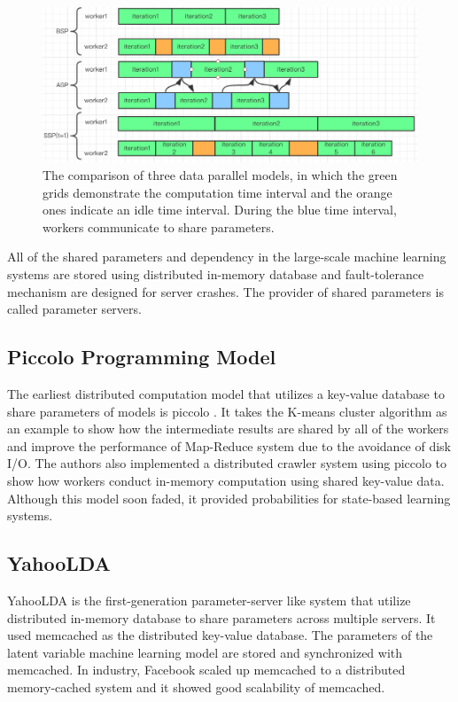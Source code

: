 \documentclass[journal]{IEEEtran}
\begin{document}
\begin{figure}
    \centering
    \includegraphics[height=0.3\textwidth, width=\linewidth]{SSP_ASP_BSP.png}
    \caption{The comparison of three data parallel models, in which the green grids demonstrate the computation time interval and the orange ones indicate an idle time interval. During the blue time interval, workers communicate to share parameters.}
    \label{fig:my_label}
\end{figure}

All of the shared parameters and dependency in the large-scale machine learning systems are stored using distributed in-memory database and fault-tolerance mechanism are designed for server crashes. The provider of shared parameters is called parameter servers.

\subsection{Piccolo Programming Model}

The earliest distributed computation model that utilizes a key-value database to share parameters of models is piccolo \cite{Piccolo}. It takes the K-means cluster algorithm as an example to show how the intermediate results are shared by all of the workers and improve the performance of Map-Reduce system due to the avoidance of disk I/O. The authors also implemented a distributed crawler system using piccolo to show how workers conduct in-memory computation using shared key-value data. Although this model soon faded, it provided probabilities for state-based learning systems.

\subsection{YahooLDA}

YahooLDA \cite{ahmed2012scalable} is the first-generation parameter-server like system that utilize distributed in-memory database to share parameters across multiple servers. It used memcached as the distributed key-value database. The parameters of the latent variable machine learning model are stored and synchronized with memcached. In industry, Facebook scaled up memcached to a distributed memory-cached system \cite{nishtala2013scaling} and it showed good scalability of memcached.
\end{document}
